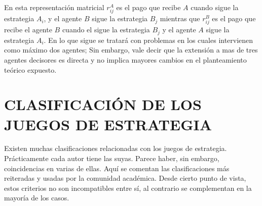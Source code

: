 En esta representación matricial $r_{ij}^A$ es el pago que recibe $A$ cuando sigue la estrategia $A_i$, y el agente $B$ sigue la estrategia $B_j$ mientras que $r_{ij}^B$ es el pago que recibe el agente $B$ cuando el sigue la estrategia $B_j$ y el agente $A$ sigue la estrategia $A_i$. En lo que sigue se tratará con problemas en los cuales intervienen como máximo dos agentes; Sin embargo, vale decir que la extensión a mas de tres agentes decisores es directa y no implica mayores cambios en el planteamiento teórico expuesto.
\\

\section{CLASIFICACIÓN DE LOS JUEGOS DE ESTRATEGIA}\label{Sec:Clas_JE}
Existen muchas clasificaciones relacionadas con los juegos de estrategia. Prácticamente cada autor tiene las suyas. Parece haber, sin embargo, coincidencias en varias de ellas. Aquí se comentan las clasificaciones más reiteradas y usadas por la comunidad académica. Desde cierto punto de vista, estos criterios no son incompatibles entre sí, al contrario se complementan en la mayoría de los casos.
\\
